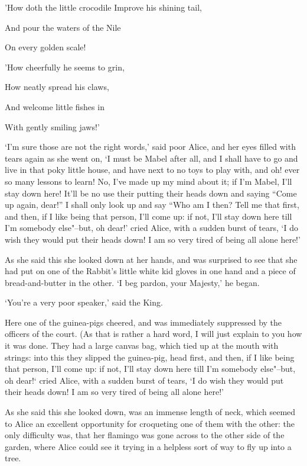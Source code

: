 \documentclass[statementpaper,twoside,openany]{memoir}
\begin{document}
'How doth the little crocodile
Improve his shining tail,

And pour the waters of the Nile

On every golden scale!


'How cheerfully he seems to grin,

How neatly spread his claws,

And welcome little fishes in

With gently smiling jaws!'

`I'm sure those are not the right words,' said poor Alice, and her eyes filled with tears again as she went on, `I must be Mabel after all, and I shall have to go and live in that poky little house, and have next to no toys to play with, and oh! ever so many lessons to learn! No, I've made up my mind about it; if I'm Mabel, I'll stay down here! It'll be no use their putting their heads down and saying ``Come up again, dear!'' I shall only look up and say ``Who am I then? Tell me that first, and then, if I like being that person, I'll come up: if not, I'll stay down here till I'm somebody else"--but, oh dear!' cried Alice, with a sudden burst of tears, `I do wish they would put their heads down! I am so very tired of being all alone here!'

As she said this she looked down at her hands, and was surprised to see that she had put on one of the Rabbit's little white kid gloves in one hand and a piece of bread-and-butter in the other. `I beg pardon, your Majesty,' he began.

`You're a very poor speaker,' said the King.

Here one of the guinea-pigs cheered, and was immediately suppressed by the officers of the court. (As that is rather a hard word, I will just explain to you how it was done. They had a large canvas bag, which tied up at the mouth with strings: into this they slipped the guinea-pig, head first, and then, if I like being that person, I'll come up: if not, I'll stay down here till I'm somebody else"--but, oh dear!` cried Alice, with a sudden burst of tears, `I do wish they would put their heads down! I am so very tired of being all alone here!'

As she said this she looked down, was an immense length of neck, which seemed to Alice an excellent opportunity for croqueting one of them with the other: the only difficulty was, that her flamingo was gone across to the other side of the garden, where Alice could see it trying in a helpless sort of way to fly up into a tree.
\end{document}
